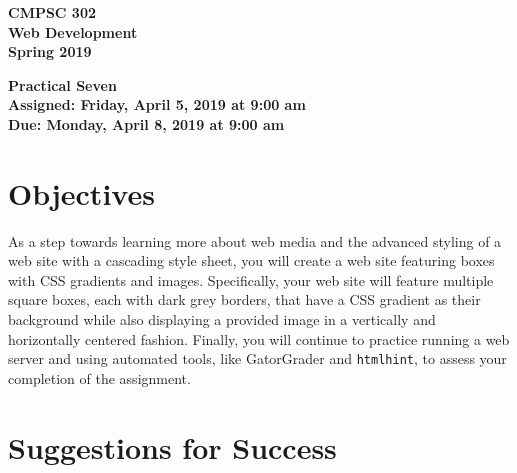 \documentclass[11pt]{article}
\newcommand{\assignmentduedate}{April 8}
\newcommand{\assignmentassignedate}{April 5}
\newcommand{\assignmentnumber}{Seven}
\newcommand{\labyear}{2019}
\newcommand{\labday}{Friday}
\newcommand{\labdueday}{Monday}
\newcommand{\labtime}{9:00 am}
\newcommand{\assigneddate}{Assigned: \labday, \assignmentassignedate, \labyear{} at \labtime{}}
\newcommand{\duedate}{Due: \labdueday, \assignmentduedate, \labyear{} at \labtime{}}
\newcommand{\program}[1]{\lstinline{#1}}
\newcommand{\labtitle}[1]
{
  \begin{center}
    \begin{center}
      \bf
      CMPSC 302\\Web Development\\
      Spring 2019\\
      \medskip
    \end{center}
    \bf
    #1
  \end{center}
}
\begin{document}
\thispagestyle{empty}

\labtitle{Practical \assignmentnumber{} \\ \assigneddate{} \\ \duedate{}}

\section*{Objectives}


As a step towards learning more about web media and the advanced styling of a
web site with a cascading style sheet, you will create a web site featuring
boxes with CSS gradients and images. Specifically, your web site will feature
multiple square boxes, each with dark grey borders, that have a CSS gradient as
their background while also displaying a provided image in a vertically and
horizontally centered fashion. Finally, you will continue to practice running a
web server and using automated tools, like GatorGrader and \program{htmlhint},
to assess your completion of the assignment.

\section*{Suggestions for Success}
\end{document}
